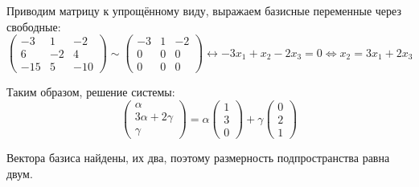 \documentclass[a4paper,12pt]{article}
\begin{document}
  \begin{solution}
    Приводим матрицу к упрощённому виду, выражаем базисные переменные через свободные:
    \[
      \begin{pmatrix}
        -3 & 1 & -2\\
        6 & -2 & 4\\
        -15 & 5 & -10
      \end{pmatrix}
      \sim \begin{pmatrix}
        -3 & 1 & -2\\
        0 & 0 & 0\\
        0 & 0 & 0
      \end{pmatrix}
      \leftrightarrow -3x_1 + x_2 - 2x_3 = 0
      \Leftrightarrow x_2 = 3x_1 + 2x_3
    \]
    
    Таким образом, решение системы:
    \[
      \begin{pmatrix}
        \alpha \\ 3\alpha + 2\gamma \\ \gamma
      \end{pmatrix}
      = \alpha \begin{pmatrix}
        1 \\ 3 \\ 0
      \end{pmatrix} + \gamma \begin{pmatrix}
        0 \\ 2 \\ 1
      \end{pmatrix}
    \]
    
    Вектора базиса найдены, их два, поэтому размерность подпространства равна двум.
  \end{solution}
\end{document}

